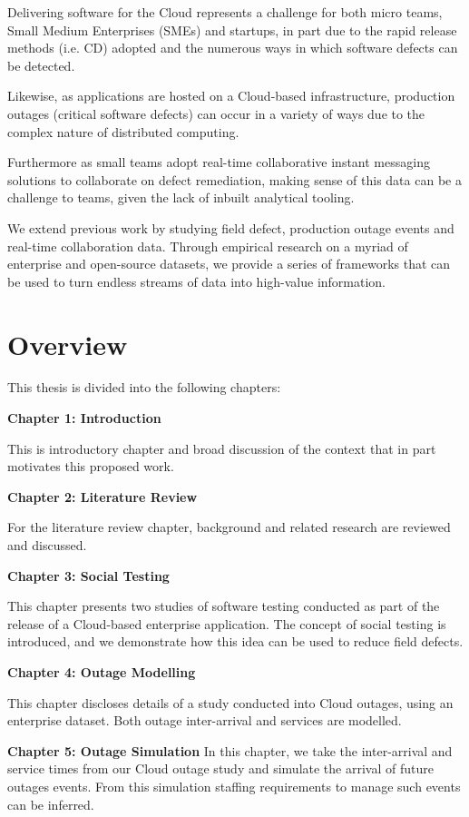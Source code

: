 Delivering software for the Cloud represents a challenge for both micro teams, Small Medium Enterprises (SMEs) and startups, in part due to the rapid release methods (i.e. CD) adopted and the numerous ways in which software defects can be detected. 

Likewise, as applications are hosted on a Cloud-based infrastructure, production outages (critical software defects) can occur in a variety of ways due to the complex nature of distributed computing.

Furthermore as small teams adopt real-time collaborative instant messaging solutions to collaborate on defect remediation, making sense of this data can be a challenge to teams, given the lack of inbuilt analytical tooling.

We extend previous work by studying field defect, production outage events and real-time collaboration data. Through empirical research on a myriad of enterprise and open-source datasets, we provide a series of frameworks that can be used to turn endless streams of data into high-value information.

\section{Overview}
This thesis is divided into the following chapters:

\textbf{Chapter 1: Introduction}

This is introductory chapter and broad discussion of the context that in part motivates this proposed work.

\textbf{Chapter 2: Literature Review}

For the literature review chapter, background and related research are reviewed and discussed.

\textbf{Chapter 3: Social Testing}

This chapter presents two studies of software testing conducted as part of the release of a Cloud-based enterprise application. The concept of social testing is introduced, and we demonstrate how this idea can be used to reduce field defects.

\textbf{Chapter 4: Outage Modelling}

This chapter discloses details of a study conducted into Cloud outages, using an enterprise dataset. Both outage inter-arrival and services are modelled.

\textbf{Chapter 5: Outage Simulation}
In this chapter, we take the inter-arrival and service times from our Cloud outage study and simulate the arrival of future outages events. From this simulation staffing requirements to manage such events can be inferred. 

